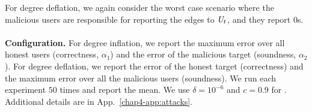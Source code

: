 For degree deflation, we again consider the worst case scenario where the malicious users are responsible for reporting the edges to $\textit{U}_t$, and they report $0$s.
\vspace{-0.2cm}\\\\
\noindent \textbf{Configuration.} %
 For degree inflation, we report the maximum error over all honest users (correctness, $\alpha_1$) and the error of the malicious target (soundness, $\alpha_2$). For degree deflation, we report the error of the honest target (correctness) and the maximum error over all the malicious users (soundness). We run each experiment $50$ times and report the mean.  We use $\delta=10^{-6}$ and $c = 0.9$ for \DegHybrid{}. Additional details are in App.~\ref{chap4-app:attacks}. %

\vspace{-0.4cm}
